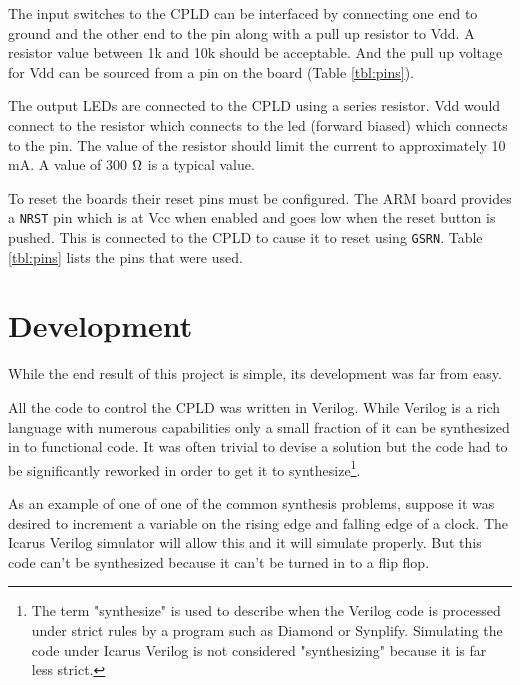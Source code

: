 \documentclass{article}
\begin{document}
The input switches to the CPLD can be interfaced by connecting
one end to ground and the other end to the pin along with a
pull up resistor to Vdd.
A resistor value between 1k and 10k should be acceptable.
And the pull up voltage for Vdd can be sourced from a pin on
the board (Table \ref{tbl:pins}).

The output LEDs are connected to the CPLD using a series
resistor.
Vdd would connect to the resistor which connects to the led
(forward biased) which connects to the pin.
The value of the resistor should limit the current to approximately
10 mA.
A value of 300 $\ohm$ is a typical value.

To reset the boards their reset pins must be configured.
The ARM board provides a \verb+NRST+ pin which is at Vcc
when enabled and goes low when the reset button is pushed\cite[Pg. 17, 20]{UM1079}.
This is connected to the CPLD to cause
it to reset using \verb+GSRN+\citetext{\citealp[Pg. 13, 46, 50, 53]{DS1002}; \citealp[Pg. 8]{EB66}}.
Table \ref{tbl:pins} lists the pins that were used.

\clearpage


\section{Development}

While the end result of this project is simple, its development
was far from easy.

All the code to control the CPLD was written in Verilog.
While Verilog is a rich language with numerous
capabilities\cite{thomas2002verilog} only a small fraction of it
can be synthesized in to functional code.
It was often trivial to devise a solution
but the code had to be significantly reworked in order to get it to
synthesize\footnote{The term "synthesize" is used to describe when
the Verilog code is processed under strict rules by a program such
as Diamond or Synplify.  Simulating the code under Icarus Verilog
is not considered "synthesizing" because it is far less strict.}.

As an example of one of one of the common synthesis problems,
suppose it was desired to increment a variable on the rising
edge and falling edge of a clock.
The Icarus Verilog\cite{VERILOG} simulator will allow this and it will simulate
properly.
But this code can't be synthesized because it can't be turned in to a flip flop.
\end{document}
